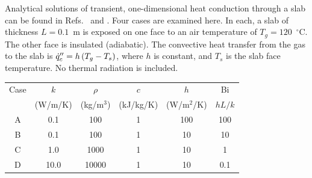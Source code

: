 \documentclass[11pt]{book}
\begin{document}
Analytical solutions of transient, one-dimensional heat conduction through a
slab can be found in Refs.~\cite{Drysdale:1} and \cite{Carslaw:1}. Four cases are examined here. In each, a slab of
thickness $L=0.1$~m is exposed on one face to an air temperature of $T_g=120$~$^\circ$C. The other face is insulated (adiabatic). The convective
heat transfer from the gas to the slab is $\dot{q}_c'' = h \, (T_g - T_s)$,
where $h$ is constant, and $T_s$ is the slab face temperature. No thermal radiation is included.
\begin{center}
\begin{tabular}{|c|c|c|c|c|c|}
\hline
Case  &  $k$      & $\rho$       &  $c$          &   $h$         &  Bi     \\
      & (W/m/K)   & (kg/m$^3$)   &  (kJ/kg/K)    &  (W/m$^2$/K)  &  $hL/k$ \\ \hline \hline
A     &   0.1     & 100          &  1            &  100          &  100    \\ \hline
B     &   0.1     & 100          &  1            &  10           &  10     \\ \hline
C     &   1.0     & 1000         &  1            &  10           &  1      \\ \hline
D     &  10.0     & 10000        &  1            &  10           & 0.1     \\ \hline
\end{tabular}
\end{center}
\end{document}
